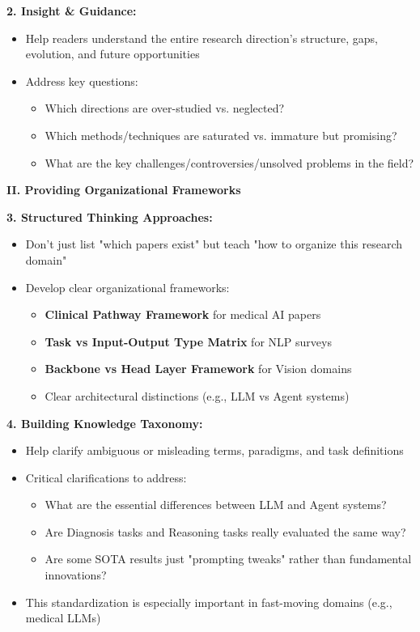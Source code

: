 \documentclass[11pt,a4paper]{article}
\begin{document}
\textbf{2. Insight \& Guidance:}
\begin{itemize}
    \item Help readers understand the entire research direction's structure, gaps, evolution, and future opportunities
    \item Address key questions:
    \begin{itemize}
        \item Which directions are over-studied vs. neglected?
        \item Which methods/techniques are saturated vs. immature but promising?
        \item What are the key challenges/controversies/unsolved problems in the field?
    \end{itemize}
\end{itemize}

\textbf{II. Providing Organizational Frameworks}

\textbf{3. Structured Thinking Approaches:}
\begin{itemize}
    \item Don't just list "which papers exist" but teach "how to organize this research domain"
    \item Develop clear organizational frameworks:
    \begin{itemize}
        \item \textbf{Clinical Pathway Framework} for medical AI papers
        \item \textbf{Task vs Input-Output Type Matrix} for NLP surveys
        \item \textbf{Backbone vs Head Layer Framework} for Vision domains
        \item Clear architectural distinctions (e.g., LLM vs Agent systems)
    \end{itemize}
\end{itemize}

\textbf{4. Building Knowledge Taxonomy:}
\begin{itemize}
    \item Help clarify ambiguous or misleading terms, paradigms, and task definitions
    \item Critical clarifications to address:
    \begin{itemize}
        \item What are the essential differences between LLM and Agent systems?
        \item Are Diagnosis tasks and Reasoning tasks really evaluated the same way?
        \item Are some SOTA results just "prompting tweaks" rather than fundamental innovations?
    \end{itemize}
    \item This standardization is especially important in fast-moving domains (e.g., medical LLMs)
\end{itemize}
\end{document}
